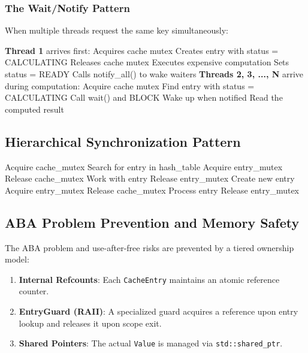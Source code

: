 \documentclass[11pt,a4paper]{article}
\begin{document}
\subsubsection{The Wait/Notify Pattern}

When multiple threads request the same key simultaneously:

\begin{algorithm}[H]
\caption{Thread Coordination for Same Key}
\begin{algorithmic}[1]
\STATE \textbf{Thread 1} arrives first:
\STATE \quad Acquires cache mutex
\STATE \quad Creates entry with status = CALCULATING
\STATE \quad Releases cache mutex
\STATE \quad Executes expensive computation
\STATE \quad Sets status = READY
\STATE \quad Calls notify\_all() to wake waiters
\STATE
\STATE \textbf{Threads 2, 3, ..., N} arrive during computation:
\STATE \quad Acquire cache mutex
\STATE \quad Find entry with status = CALCULATING
\STATE \quad Call wait() and BLOCK
\STATE \quad Wake up when notified
\STATE \quad Read the computed result
\end{algorithmic}
\end{algorithm}

\subsection{Hierarchical Synchronization Pattern}

\begin{algorithm}
\caption{Safe Synchronization Pattern}
\begin{algorithmic}[1]
\STATE Acquire cache\_mutex
\STATE Search for entry in hash\_table
    \STATE Acquire entry\_mutex
    \STATE Release cache\_mutex
    \STATE Work with entry
    \STATE Release entry\_mutex
\ELSE
    \STATE Create new entry
    \STATE Acquire entry\_mutex
    \STATE Release cache\_mutex
    \STATE Process entry
    \STATE Release entry\_mutex
\ENDIF
\end{algorithmic}
\end{algorithm}

\subsection{ABA Problem Prevention and Memory Safety}

The ABA problem and use-after-free risks are prevented by a tiered
ownership model:

\begin{enumerate}
\item \textbf{Internal Refcounts}: Each \texttt{CacheEntry} maintains an
      atomic reference counter.
\item \textbf{EntryGuard (RAII)}: A specialized guard acquires a 
      reference upon entry lookup and releases it upon scope exit.
\item \textbf{Shared Pointers}: The actual \texttt{Value} is managed 
      via \texttt{std::shared\_ptr}.
\end{enumerate}
\end{document}
